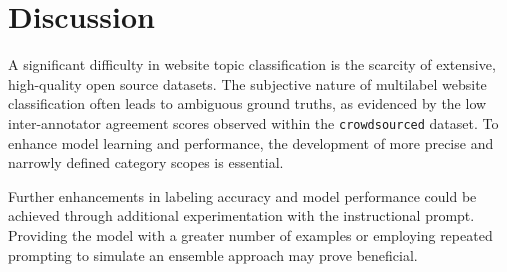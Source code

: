 \section{Discussion}
\label{sec:discussion}

A significant difficulty in website topic classification is the scarcity of extensive, high-quality open source datasets. The subjective nature of multilabel website classification often leads to ambiguous ground truths, as evidenced by the low inter-annotator agreement scores observed within the \texttt{crowdsourced} dataset. To enhance model learning and performance, the development of more precise and narrowly defined category scopes is essential.

Further enhancements in labeling accuracy and model performance could be achieved through additional experimentation with the instructional prompt. 
Providing the model with a greater number of examples or employing repeated prompting to simulate an ensemble approach may prove beneficial.